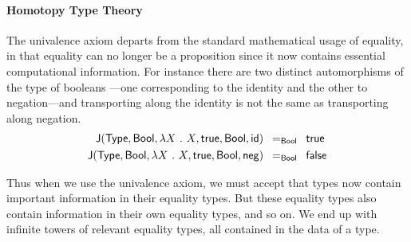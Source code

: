 \paragraph*{Homotopy Type Theory}
% 
The univalence axiom departs from the standard mathematical usage of equality, 
in that equality can no longer be a proposition since it now contains essential
computational information. 
% 
For instance there are two distinct automorphisms of the type of booleans 
---one corresponding to the identity and the other to negation---and transporting along
the identity is not the same as transporting along negation.
\[
\begin{split}
\indJ{\varType}{\mathsf{Bool}}{\lambda X\ .\ X}{\mathsf{true}}{\mathsf{Bool}}{\mathsf{id}} & \enskip =_{\mathsf{Bool}} \enskip \mathsf{true} \\
\indJ{\varType}{\mathsf{Bool}}{\lambda X\ .\ X}{\mathsf{true}}{\mathsf{Bool}}{\mathsf{neg}} & \enskip =_{\mathsf{Bool}} \enskip \mathsf{false}
\end{split}
\]

Thus when we use the univalence axiom, we must accept that types now contain 
important information in their equality types. 
% 
But these equality types also contain information in their own equality types,
and so on. 
% 
We end up with infinite towers of relevant equality types, all contained in the
data of a type.

